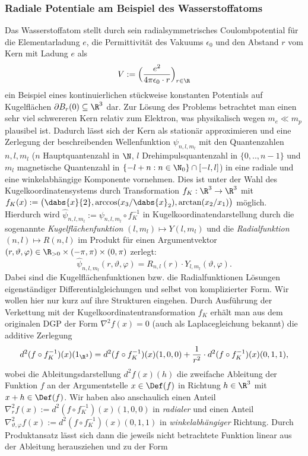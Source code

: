 \documentclass[../main.tex]{subfiles}
\begin{document}
        \subsubsection{Radiale Potentiale am Beispiel des Wasserstoffatoms}
            Das Wasserstoffatom stellt durch sein radialsymmetrisches Coulombpotential für die Elementarladung $e$, die Permittivität des Vakuums $\epsilon_0$ und den Abstand $r$ vom Kern mit Ladung $e$ als 
            \[
                V:=\Bigl(\frac{e^2}{4\pi\epsilon_0\cdot r}\Bigr)_{r\in\R}
            \]
            ein Beispiel eines kontinuierlichen stückweise konstanten Potentials auf Kugelflächen $\partial B_r(0)\subseteq\R^3$ dar. Zur Lösung des Problems betrachtet man einen sehr viel schwereren Kern relativ zum Elektron, was physikalisch wegen $m_e\ll m_p$ plausibel ist. Dadurch lässt sich der Kern als stationär approximieren und eine Zerlegung der beschreibenden Wellenfunktion $\psi_{n,l,m_l}$ mit den Quantenzahlen $n,l,m_l$ ($n$ Hauptquantenzahl in $\N$, $l$ Drehimpulsquantenzahl in $\{0,..,n-1\}$ und $m_l$ magnetische Quantenzahl in $\{-l + n:n\in\N_0\}\cap[-l,l]$) in eine radiale und eine winkelabhängige Komponente vornehmen. Dies ist unter der Wahl des Kugelkoordinatensystems durch Transformation $f_K:\R^3\to\R^3$ mit $f_K(x) := \bigl(\dabs{x}{2}, \arccos(x_3/\dabs{x}_2), \arctan(x_2/x_1)\bigr)$ möglich. Hierdurch wird $\hat\psi_{n,l,m_l}:=\psi_{n,l,m_l}\circ f_K^{-1}$ in Kugelkoordinatendarstellung durch die sogenannte \emph{Kugelflächenfunktion} $(l,m_l)\mapsto Y(l,m_l)$ und die \emph{Radialfunktion} $(n,l)\mapsto R(n,l)$ im Produkt für einen Argumentvektor $(r,\vartheta,\varphi)\in\R_{>0}\times(-\pi,\pi)\times(0,\pi)$ zerlegt:
            \[
                \hat\psi_{n,l,m_l}(r,\vartheta,\varphi) = R_{n,l}(r)\cdot Y_{l,m_l}(\vartheta,\varphi).
            \]
            Dabei sind die Kugelflächenfunktionen bzw. die Radialfunktionen Lösungen eigenständiger Differentialgleichungen und selbst von komplizierter Form. Wir wollen hier nur kurz auf ihre Strukturen eingehen. Durch Ausführung der Verkettung mit der Kugelkoordinatentransformation $f_K$ erhält man aus dem originalen DGP der Form $\nabla^2 f(x) = 0$ (auch als Laplacegleichung bekannt) die additive Zerlegung
            \[
                d^2(f\circ f_K^{-1})(x)(1_{\R^3}) = d^2(f\circ f_K^{-1})(x)(1,0,0) + \frac{1}{r^2}\cdot d^2(f\circ f_K^{-1})(x)(0,1,1),
            \]
            wobei die Ableitungsdarstellung $d^2 f(x)(h)$ die zweifache Ableitung der Funktion $f$ an der Argumentstelle $x\in\Def(f)$ in Richtung $h\in\R^3$ mit $x+h\in\Def(f)$. Wir haben also anschaulich einen Anteil $\nabla^2_r f(x):=d^2(f\circ f_K^{-1})(x)(1,0,0)$ in \emph{radialer} und einen Anteil $\nabla^2_{\vartheta,\varphi} f(x):=d^2(f\circ f_K^{-1})(x)(0,1,1)$ in \emph{winkelabhängiger} Richtung. Durch Produktansatz lässt sich dann die jeweils nicht betrachtete Funktion linear aus der Ableitung herausziehen und zu der Form 
\end{document}
